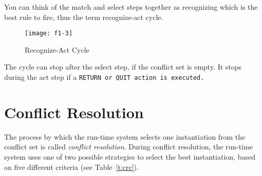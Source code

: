 You can think of the match and select steps together as recognizing
which is the best rule to fire, thus the term recognize-act cycle.

\begin{figure}[h]
  \centering
  \texttt{[image: f1-3]}
  \caption{Recognize-Act Cycle}
  \label{f:1-3}
\end{figure}

The cycle can stop after the select step, if the conflict set is
empty. It stops during the act step if a \tt{RETURN} or \tt{QUIT}
action is executed.

\section{Conflict Resolution}

The process by which the run-time system selects one instantiation
from the conflict set is called \emph{conflict resolution}. During
conflict resolution, the run-time system uses one of two possible
strategies to select the best instantiation, based on five different
criteria (see Table~\ref{t:crc}).

